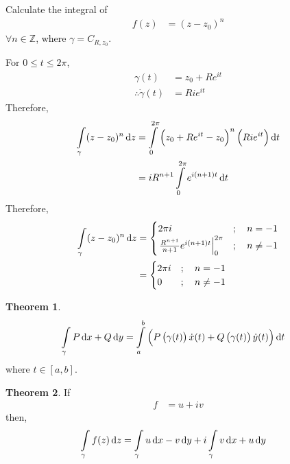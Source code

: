 \documentclass[titlepage, fleqn, a4paper, 12pt, twoside]{article}
\theoremstyle{definition}
\theoremstyle{theorem}
\newtheorem{theorem}{Theorem}
\begin{document}
\begin{question}
	Calculate the integral of
	\begin{align*}
		f(z) & = (z - z_0)^n
	\end{align*}
	$\forall n \in \mathbb{Z}$, where $\gamma = C_{R,z_0}$.
\end{question}

\begin{solution}
	For $0 \le t \le 2 \pi$,
	\begin{align*}
		\gamma(t)                  & = z_0 + R e^{i t} \\
		\therefore \dot{\gamma}(t) & = R i e^{i t}
	\end{align*}
	Therefore,
	\begin{align*}
		\int\limits_{\gamma} (z - z_0)^n \dif z & = \int\limits_{0}^{2 \pi} \left( z_0 + R e^{i t} - z_0 \right)^n \left( R i e^{i t} \right) \dif t \\
                                                        & = i R^{n + 1} \int\limits_{0}^{2 \pi} e^{i (n + 1) t} \dif t
	\end{align*}
	Therefore,
	\begin{align*}
		\int\limits_{\gamma} (z - z_0)^n \dif z &=
			\begin{cases}
				2 \pi i                                                            & ;\quad n = -1    \\
				\left. \frac{R^{n + 1}}{n + 1} e^{i (n + 1) t} \right|_{0}^{2 \pi} & ;\quad n \neq -1 \\
			\end{cases}\\
		&=
			\begin{cases}
				2 \pi i & ;\quad n = -1    \\
				0       & ;\quad n \neq -1 \\
			\end{cases}
	\end{align*}
\end{solution}

\begin{theorem}
	\begin{align*}
		\int\limits_{\gamma} P \dif x + Q \dif y &= \int\limits_{a}^{b} \left( P\left( \gamma(t) \right) \dot{x}(t) + Q\left( \gamma(t) \right) \dot{y}(t) \right) \dif t
	\end{align*}
	where $t \in [a,b]$.
\end{theorem}

\begin{theorem}
	If
	\begin{align*}
		f &= u + i v
	\end{align*}
	then,
	\begin{align*}
		\int\limits_{\gamma} f(z) \dif z &= \int\limits_{\gamma} u \dif x - v \dif y + i \int\limits_{\gamma} v \dif x + u \dif y
	\end{align*}
\end{theorem}
\end{document}
